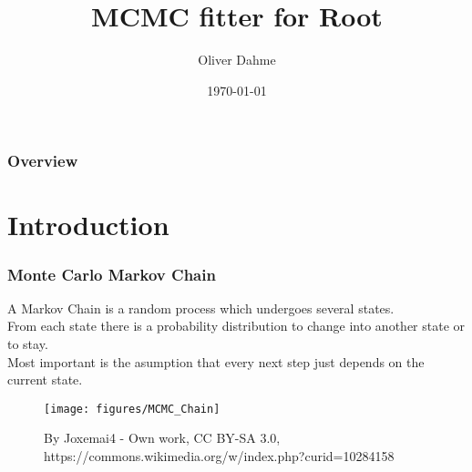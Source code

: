 \documentclass{beamer}
\title[RooMCMC]{MCMC fitter for Root} %
\author{Oliver Dahme} %
\institute[UZH] %
{
University of Zurich \\ %
\medskip
\textit{o.dahme@cern.ch} %
}
\date{\today} %
\begin{document}
\begin{frame}
\titlepage %
\end{frame}

\begin{frame}
\frametitle{Overview} %
\tableofcontents %
\end{frame}


\section{Introduction} %

\begin{frame}
\frametitle{Monte Carlo Markov Chain}
A Markov Chain is a random process which undergoes several states. \\
From each state there is a probability distribution to change into another state or to stay. \\
Most important is the asumption that every next step just depends on the current state.
\begin{figure}
\texttt{[image: figures/MCMC\_Chain]}
\caption{By Joxemai4 - Own work, CC BY-SA 3.0, https://commons.wikimedia.org/w/index.php?curid=10284158}
\end{figure}
\end{frame}

\end{document}
